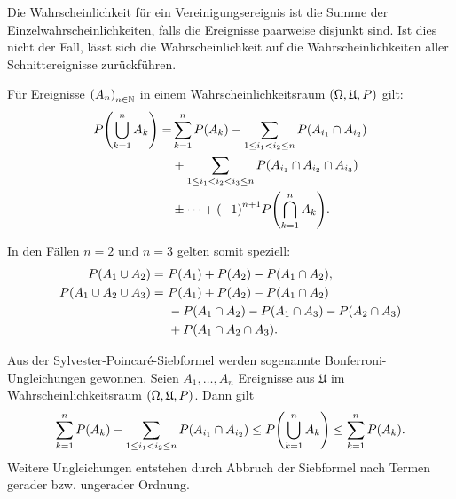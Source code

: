 \documentclass{lecture}
\begin{document}
    Die Wahrscheinlichkeit für ein Vereinigungsereignis ist die Summe der Einzelwahrscheinlichkeiten, falls die Ereignisse paarweise disjunkt sind.
    Ist dies nicht der Fall, lässt sich die Wahrscheinlichkeit auf die Wahrscheinlichkeiten aller Schnittereignisse zurückführen.

    \begin{lemma}
        Für Ereignisse \(\parentheses*{A_n}_{n \in \N}\) in einem Wahrscheinlichkeitsraum \(\parentheses*{\Omega, \mathfrak{U}, P}\) gilt:
        \begin{align*}
            P\parentheses*{\bigcup_{k = 1}^n A_k} = &\sum_{k = 1}^n P\parentheses*{A_k} - \sum_{1 \le i_1 < i_2 \le n} P\parentheses*{A_{i_1} \cap A_{i_2}}\\
            &+ \sum_{1 \le i_1 < i_2 < i_3 \le n}P\parentheses*{A_{i_1} \cap A_{i_2} \cap A_{i_3}}\\
            &\pm \cdots + \parentheses*{-1}^{n + 1}P\parentheses*{\bigcap_{k = 1}^n A_k}.
        \end{align*}
    \end{lemma}
    In den Fällen \(n = 2\) und \(n = 3\) gelten somit speziell:
    \begin{align*}
        P\parentheses*{A_1 \cup A_2} =\ &P\parentheses*{A_1} + P\parentheses*{A_2} - P\parentheses*{A_1 \cap A_2},\\
        P\parentheses*{A_1 \cup A_2 \cup A_3} =\ &P\parentheses*{A_1} + P\parentheses*{A_2} - P\parentheses*{A_1 \cap A_2}\\
        &- P\parentheses*{A_1 \cap A_2} - P\parentheses*{A_1 \cap A_3} - P\parentheses*{A_2 \cap A_3}\\
        &+ P\parentheses*{A_1 \cap A_2 \cap A_3}.
    \end{align*}

    \begin{remark}
        Aus der Sylvester-Poincaré-Siebformel werden sogenannte Bonferroni-Ungleichungen gewonnen.
        Seien \(A_1, \ldots, A_n\) Ereignisse aus \(\mathfrak{U}\) im Wahrscheinlichkeitsraum \(\parentheses*{\Omega, \mathfrak{U}, P}\).
        Dann gilt
        \[
            \sum_{k = 1}^n P\parentheses*{A_k} - \sum_{1 \le i_1 < i_2 \le n}P\parentheses*{A_{i_1} \cap A_{i_2}} \le P\parentheses*{\bigcup_{k = 1}^n A_k} \le \sum_{k = 1}^n P\parentheses*{A_k}.
        \]
        Weitere Ungleichungen entstehen durch Abbruch der Siebformel nach Termen gerader bzw. ungerader Ordnung.
    \end{remark}
\end{document}
